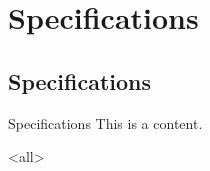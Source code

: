 \chapter{Specifications}
\label{chap_spec}


\section{Specifications}

\begin{frame}{Specifications}
  This is a content.
\end{frame}



\exercises

\mode
<all>